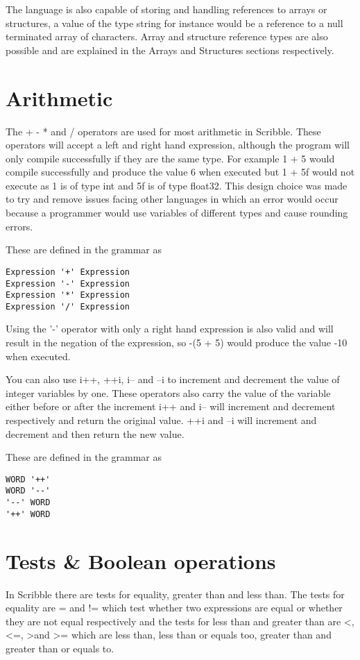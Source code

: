 \documentclass[]{final_report}
\begin{document}
The language is also capable of storing and handling references to arrays or structures, a value of the type string for instance would be a reference to a null terminated array of characters. Array and structure reference types are also possible and are explained in the Arrays and Structures sections respectively.

\section{Arithmetic}

The + - * and / operators are used for most arithmetic in Scribble. These operators will accept a left and right hand expression, although the program will only compile successfully if they are the same type. For example 1 + 5 would compile successfully and produce the value 6 when executed but 1 + 5f would not execute as 1 is of type int and 5f is of type float32. This design choice was made to try and remove issues facing other languages in which an error would occur because a programmer would use variables of different types and cause rounding errors.

These are defined in the grammar as 
\begin{verbatim}
Expression '+' Expression
Expression '-' Expression
Expression '*' Expression
Expression '/' Expression
\end{verbatim}

Using the '-' operator with only a right hand expression is also valid and will result in the negation of the expression, so -(5 + 5) would produce the value -10 when executed.

You can also use i++, ++i, i-- and --i to increment and decrement the value of integer variables by one. These operators also carry the value of the variable either before or after the increment i++ and i-- will increment and decrement respectively and return the original value. ++i and --i will increment and decrement and then return the new value.

These are defined in the grammar as
\begin{verbatim}
WORD '++'
WORD '--'
'--' WORD
'++' WORD
\end{verbatim}


\section{Tests \& Boolean operations}

In Scribble there are tests for equality, greater than and less than. The tests for equality are = and != which test whether two expressions are equal or whether they are not equal respectively and the tests for less than and greater than are \textless, \textless=, \textgreater and \vspace{1pt} \textgreater= which are less than, less than or equals too, greater than and greater than or equals to.
\end{document}

